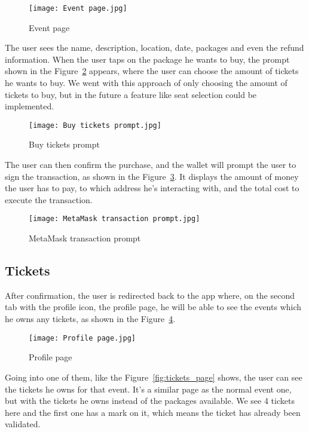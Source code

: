 \begin{figure}[H]
	\texttt{[image: Event page.jpg]}
	\centering
	\caption{Event page}\label{fig:event_page}
\end{figure}

The user sees the name, description, location, date, packages and even the
refund information. When the user taps on the package he wants to buy, the
prompt shown in the Figure~\ref{fig:buy_tickets_prompt} appears, where the user
can choose the amount of tickets he wants to buy. We went with this approach of
only choosing the amount of tickets to buy, but in the future a feature like
seat selection could be implemented.

\begin{figure}[H]
	\texttt{[image: Buy tickets prompt.jpg]}
	\centering
	\caption{Buy tickets prompt}\label{fig:buy_tickets_prompt}
\end{figure}

The user can then confirm the purchase, and the wallet will prompt the user to
sign the transaction, as shown in the
Figure~\ref{fig:metamask_transaction_prompt}. It displays the amount of money
the user has to pay, to which address he's interacting with, and the total cost
to execute the transaction.

\begin{figure}[H]
	\texttt{[image: MetaMask transaction prompt.jpg]}
	\centering
	\caption{MetaMask transaction prompt}\label{fig:metamask_transaction_prompt}
\end{figure}

\subsection{Tickets}\label{subsec:tickets}

After confirmation, the user is redirected back to the app where, on the second
tab with the profile icon, the profile page, he will be able to see the events
which he owns any tickets, as shown in the Figure~\ref{fig:profile_page}.

\begin{figure}[H]
	\texttt{[image: Profile page.jpg]}
	\centering
	\caption{Profile page}\label{fig:profile_page}
\end{figure}

Going into one of them, like the Figure~\ref{fig:tickets_page} shows, the user
can see the tickets he owns for that event. It's a similar page as the normal
event one, but with the tickets he owns instead of the packages available. We
see 4 tickets here and the first one has a mark on it, which means the ticket
has already been validated.

